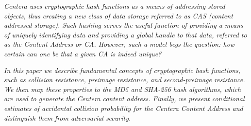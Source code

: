 \emph{Centera uses cryptographic hash functions as a means of addressing
stored objects, thus creating a new class of data storage referred to as
CAS (content addressed storage). Such hashing serves the useful function
of providing a means of uniquely identifying data and providing a global
handle to that data, referred to as the Content Address or CA. However,
such a model begs the question: how certain can one be that a given CA
is indeed unique?}

\emph{In this paper we describe fundamental concepts of cryptographic
hash functions, such as collision resistance, preimage resistance, and
second-preimage resistance. We then map these properties to the MD5 and
SHA-256 hash algorithms, which are used to generate the Centera content
address. Finally, we present conditional estimates of accidental collision probability for the
Centera Content Address and distinguish them from adversarial security.}

